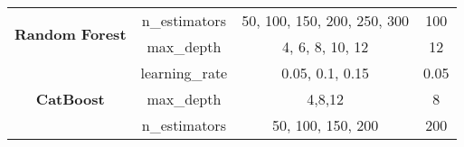 \documentclass[../main.tex]{subfiles}
\begin{document}
\begin{table}[H]
\begin{tabular}{|c|cc|c|}
            \multirow{2}{*}{\textbf{Random Forest}} & \multicolumn{1}{c|}{n\_estimators}  & 50, 100, 150, 200, 250, 300   & 100                                      \\ \cline{2-4} 
                                                    & \multicolumn{1}{c|}{max\_depth}     & 4, 6, 8, 10, 12               & 12                                       \\ \hline
            \multirow{3}{*}{\textbf{CatBoost}}      & \multicolumn{1}{c|}{learning\_rate} & 0.05, 0.1, 0.15               & 0.05                                     \\ \cline{2-4} 
                                                    & \multicolumn{1}{c|}{max\_depth}     & 4,8,12                        & 8                                        \\ \cline{2-4} 
                                                    & \multicolumn{1}{c|}{n\_estimators}  & 50, 100, 150, 200             & 200                                      \\ \hline
            \end{tabular}
        \end{table}
\end{document}
